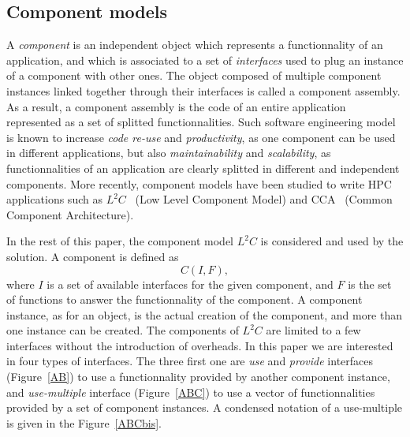 \subsection{Component models}
A \textit{component} is an independent object which represents a functionnality of an application, and which is associated to a set of \textit{interfaces} used to plug an instance of a component with other ones. The object composed of multiple component instances linked together through their interfaces is called a component assembly. As a result, a component assembly is the code of an entire application represented as a set of splitted functionnalities. Such software engineering model is known to increase \textit{code re-use} and \textit{productivity}, as one component can be used in different applications, but also \textit{maintainability} and \textit{scalability}, as functionnalities of an application are clearly splitted in different and independent components. More recently, component models have been studied to write HPC applications such as $L^2C$~\cite{} (Low Level Component Model) and CCA~\cite{} (Common Component Architecture).

In the rest of this paper, the component model $L^2C$ is considered and used by the solution. A component is defined as
\begin{equation}
C(I,F),
\end{equation}
where $I$ is a set of available interfaces for the given component, and $F$ is the set of functions to answer the functionnality of the component. A component instance, as for an object, is the actual creation of the component, and more than one instance can be created. The components of $L^2C$ are limited to a few interfaces without the introduction of overheads. In this paper we are interested in four types of interfaces. The three first one are \textit{use} and \textit{provide} interfaces (Figure~\ref{AB}) to use a functionnality provided by another component instance, and \textit{use-multiple} interface (Figure~\ref{ABC}) to use a vector of functionnalities provided by a set of component instances. A condensed notation of a use-multiple is given in the Figure~\ref{ABCbis}. 


